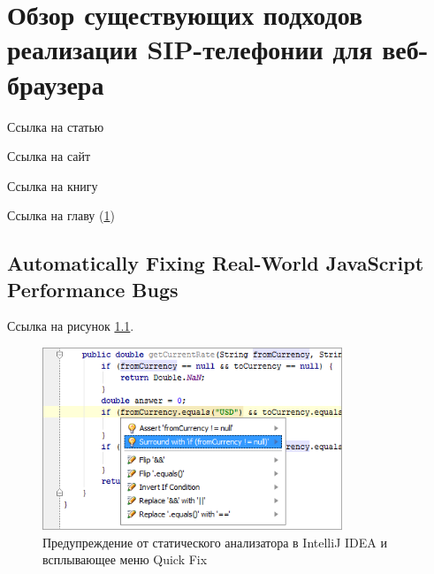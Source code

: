 \chapter{Обзор существующих подходов реализации SIP-телефонии для веб-браузера}
\label{chapter:analysis}

Ссылка на статью\cite{javascript}

Ссылка на сайт\cite{ANTLR}

Ссылка на книгу\cite{java-book}

Ссылка на главу (\ref{chapter:analysis})

\section{Automatically Fixing Real-World JavaScript Performance Bugs}

Ссылка на рисунок \ref{fig:idea}.

\begin{figure}[htbp]
	\centering
	\includegraphics[width=0.8\textwidth]{fig/code_analysis_bugs.png}
	\caption{Предупреждение от статического анализатора в IntelliJ IDEA и всплывающее меню Quick Fix}%
	\label{fig:idea}
\end{figure}